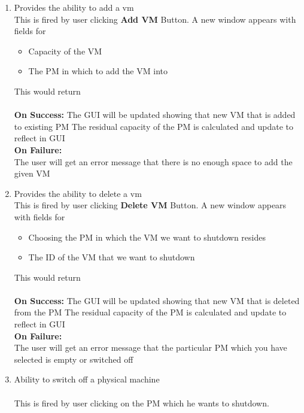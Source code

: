\documentclass[a4paper,11pt]{article}
\begin{document}
			\begin{enumerate}
				\item Provides the ability to add a vm
				\\This is fired by user clicking {\bf Add VM } Button. A new window appears with fields for  
				\begin{itemize}
				 \item Capacity of the VM
				 \item The PM in which to add the VM into
				\end{itemize}
				
				This would return \\\\
				{\bf On Success: }
				The GUI will be updated showing that new  VM that is added to existing PM
				The residual capacity of the PM is calculated and update to reflect in GUI\\
				{\bf On Failure: } \\
				The user will get an error message that there is no enough space to add the given VM
				
				\item Provides the ability to delete a vm
				\\This is fired by user clicking {\bf Delete VM } Button. A new window appears with fields for  
				\begin{itemize}
				 \item Choosing the PM in which the VM we want to shutdown resides
				 \item The ID of the VM that we want to shutdown
				\end{itemize}
				
				This would return \\\\
				{\bf On Success: }
				The GUI will be updated showing that new  VM that is deleted from the PM
				The residual capacity of the PM is calculated and update to reflect in GUI\\
				{\bf On Failure: } \\
				The user will get an error message that the particular PM which you have selected is empty or 
				switched off
				
				
				
				\item Ability to switch off a physical machine\\
				\\This is fired by user clicking on the PM which he wants to shutdown. 
								

\end{enumerate}
\end{document}
